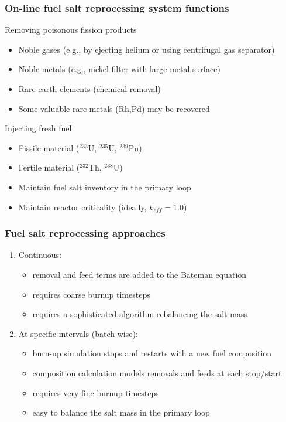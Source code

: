 \begin{frame}
\frametitle{On-line fuel salt reprocessing system functions}
\begin{block}{Removing poisonous fission products}
	\begin{itemize}
		\item Noble gases (e.g., by ejecting helium or using centrifugal gas separator)
		\item Noble metals (e.g., nickel filter with large metal surface)
                \item Rare earth elements (chemical removal)
		\item Some valuable rare metals (Rh,Pd) may be recovered %
	\end{itemize}
\end{block}

\begin{block}{Injecting fresh fuel}
	\begin{itemize}
		\item Fissile material ($^{233}$U, $^{235}$U, $^{239}$Pu)
		\item Fertile material ($^{232}$Th, $^{238}$U)
		\item Maintain fuel salt inventory in the primary loop
		\item Maintain reactor criticality (ideally, $k_{eff}=1.0$)
	\end{itemize}
\end{block}

\end{frame}


\begin{frame}
\frametitle{Fuel salt reprocessing approaches}

\begin{enumerate}
	\itemsep2em
	\item Continuous:
	\begin{itemize}
		\item removal and feed terms are added to the Bateman equation
		\item requires coarse burnup timesteps
		\item requires a sophisticated algorithm rebalancing the salt mass 
	\end{itemize}
	\item At specific intervals (batch-wise): 
	\begin{itemize}
		\item burn-up simulation stops and restarts with a new fuel composition
                \item composition calculation models removals and feeds at each 
                        stop/start
		\item requires very fine burnup timesteps
		\item easy to balance the salt mass in the primary loop
	\end{itemize}
\end{enumerate}


\end{frame}


